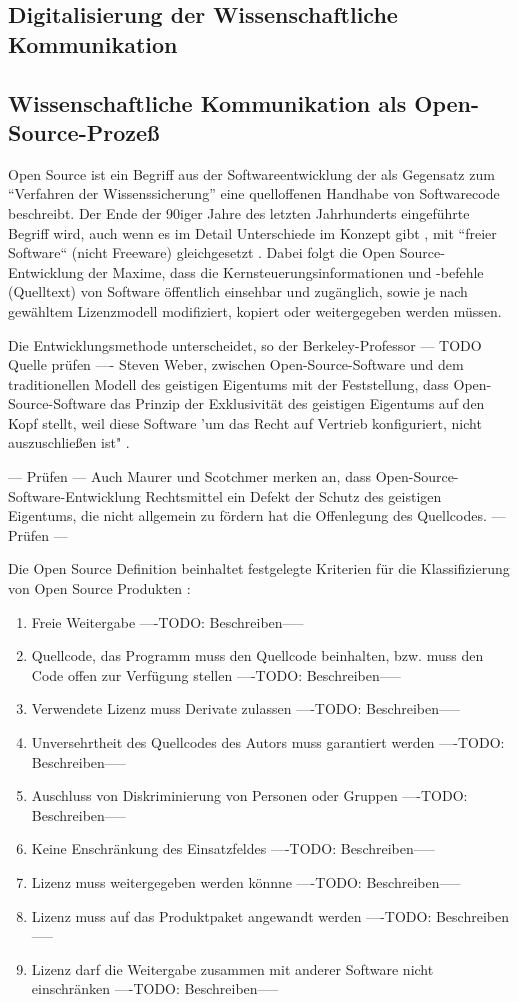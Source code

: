 \subsection{Digitalisierung der Wissenschaftliche Kommunikation}

\subsection{Wissenschaftliche Kommunikation als Open-Source-Prozeß}

Open Source ist ein Begriff aus der Softwareentwicklung der als Gegensatz zum “Verfahren der Wissenssicherung” \cite{stallman2002} eine quelloffenen Handhabe von Softwarecode beschreibt. Der Ende der 90iger Jahre des letzten Jahrhunderts eingeführte Begriff wird, auch wenn es im Detail Unterschiede im Konzept gibt \cite{suchen}, mit “freier Software“ (nicht Freeware) gleichgesetzt \cite{suchen}. Dabei folgt die Open Source-Entwicklung der Maxime, dass die Kernsteuerungsinformationen und -befehle (Quelltext) von Software öffentlich einsehbar und zugänglich, sowie je nach gewähltem Lizenzmodell modifiziert, kopiert oder weitergegeben werden müssen\cite{suchen}. 

Die Entwicklungsmethode unterscheidet, so der Berkeley-Professor --- TODO Quelle prüfen ---- Steven Weber, zwischen Open-Source-Software und dem traditionellen Modell des geistigen Eigentums mit der Feststellung, dass Open-Source-Software das Prinzip der Exklusivität des geistigen Eigentums auf den Kopf stellt, weil diese Software 'um das Recht auf Vertrieb konfiguriert, nicht auszuschließen ist" \cite{suchen}. 

--- Prüfen ---
Auch Maurer und Scotchmer merken an, dass Open-Source-Software-Entwicklung Rechtsmittel ein Defekt der Schutz des geistigen Eigentums, die nicht allgemein zu fördern hat die Offenlegung des Quellcodes. 
--- Prüfen ---

Die Open Source Definition beinhaltet festgelegte Kriterien für die Klassifizierung von Open Source Produkten \cite{suchen}:
\begin{enumerate}
\item Freie Weitergabe
----TODO: Beschreiben-----
\item Quellcode, das Programm muss den Quellcode beinhalten, bzw. muss den Code offen zur Verfügung stellen
----TODO: Beschreiben-----
\item Verwendete Lizenz muss Derivate zulassen
----TODO: Beschreiben-----
\item Unversehrtheit des Quellcodes des Autors muss garantiert werden
----TODO: Beschreiben-----
\item Auschluss von Diskriminierung von Personen oder Gruppen
----TODO: Beschreiben-----
\item Keine Enschränkung des Einsatzfeldes
----TODO: Beschreiben-----
\item Lizenz muss weitergegeben werden könnne
----TODO: Beschreiben-----
\item Lizenz muss auf das Produktpaket angewandt werden
----TODO: Beschreiben-----
\item Lizenz darf die Weitergabe zusammen mit anderer Software nicht einschränken
----TODO: Beschreiben-----
\end{enumerate}

